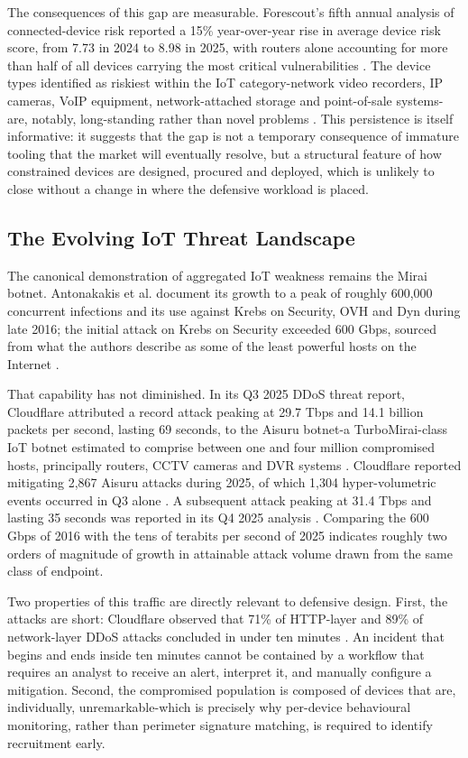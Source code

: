 The consequences of this gap are measurable. Forescout's fifth annual analysis of connected-device risk reported a 15\% year-over-year rise in average device risk score, from 7.73 in 2024 to 8.98 in 2025, with routers alone accounting for more than half of all devices carrying the most critical vulnerabilities \cite{Forescout2025}. The device types identified as riskiest within the IoT category-network video recorders, IP cameras, VoIP equipment, network-attached storage and point-of-sale systems-are, notably, long-standing rather than novel problems \cite{Forescout2025}. This persistence is itself informative: it suggests that the gap is not a temporary consequence of immature tooling that the market will eventually resolve, but a structural feature of how constrained devices are designed, procured and deployed, which is unlikely to close without a change in where the defensive workload is placed.

\subsection{The Evolving IoT Threat Landscape}

The canonical demonstration of aggregated IoT weakness remains the Mirai botnet. Antonakakis et al. document its growth to a peak of roughly 600,000 concurrent infections and its use against Krebs on Security, OVH and Dyn during late 2016; the initial attack on Krebs on Security exceeded 600 Gbps, sourced from what the authors describe as some of the least powerful hosts on the Internet \cite{Antonakakis2017}.

That capability has not diminished. In its Q3 2025 DDoS threat report, Cloudflare attributed a record attack peaking at 29.7 Tbps and 14.1 billion packets per second, lasting 69 seconds, to the Aisuru botnet-a TurboMirai-class IoT botnet estimated to comprise between one and four million compromised hosts, principally routers, CCTV cameras and DVR systems \cite{Cloudflare2025Q3, Kovacs2025}. Cloudflare reported mitigating 2,867 Aisuru attacks during 2025, of which 1,304 hyper-volumetric events occurred in Q3 alone \cite{Cloudflare2025Q3}. A subsequent attack peaking at 31.4 Tbps and lasting 35 seconds was reported in its Q4 2025 analysis \cite{Cloudflare2026Q4}. Comparing the 600 Gbps of 2016 with the tens of terabits per second of 2025 indicates roughly two orders of magnitude of growth in attainable attack volume drawn from the same class of endpoint.

Two properties of this traffic are directly relevant to defensive design. First, the attacks are short: Cloudflare observed that 71\% of HTTP-layer and 89\% of network-layer DDoS attacks concluded in under ten minutes \cite{Cloudflare2025Q3}. An incident that begins and ends inside ten minutes cannot be contained by a workflow that requires an analyst to receive an alert, interpret it, and manually configure a mitigation. Second, the compromised population is composed of devices that are, individually, unremarkable-which is precisely why per-device behavioural monitoring, rather than perimeter signature matching, is required to identify recruitment early.

